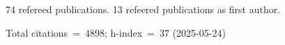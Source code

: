 74 refereed publications. 13 refeered publications as first author.

Total citations~=~4898; h-index~=~37 (2025-05-24)